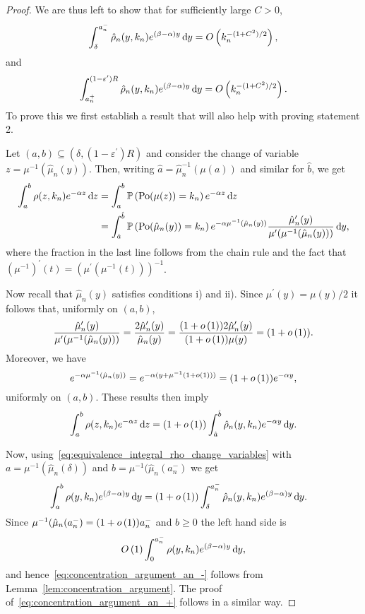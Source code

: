 \begin{proof}
We are thus left to show that for sufficiently large $C > 0$,
\begin{equation}\label{eq:concentration_argument_an_-}
	 \int_\delta^{a_n^-} \hat{\rho}_n(y,k_n) e^{(\beta-\alpha) y} \operatorname{\mathrm{d}\hspace{-2pt}} y = O\left(k_n^{-(1+C^2)/2}\right),
\end{equation}
and
\begin{equation}\label{eq:concentration_argument_an_+}
	\int_{a_n^+}^{(1-\varepsilon^\prime)R} \hat{\rho}_n(y,k_n) e^{(\beta-\alpha) y} \operatorname{\mathrm{d}\hspace{-2pt}} y = O\left(k_n^{-(1+C^2)/2}\right).
\end{equation}
To prove this we first establish a result that will also help with proving statement 2. 

Let $(a, b) \subseteq (\delta,(1-\varepsilon^\prime)R)$ and consider the change of variable $z = \mu^{-1}(\hat{\mu}_n(y))$. Then, writing $\hat{a} = \hat{\mu}_n^{-1}(\mu(a))$ and similar for $\hat{b}$, we get
\begin{align*}
	\int_{a}^{b} \rho(z,k_n) e^{-\alpha z} \operatorname{\mathrm{d}\hspace{-2pt}} z 
	&= \int_{a}^{b} \mathbb{P}\left({\mathrm{Po}}(\mu(z)) = k_n\right) e^{-\alpha z} \operatorname{\mathrm{d}\hspace{-2pt}} z\\
	&= \int_{\hat{a}}^{\hat{b}} \mathbb{P}\left({\mathrm{Po}}(\hat{\mu}_n(y)) = k_n\right) e^{-\alpha \mu^{-1}(\hat{\mu}_n(y))} 
		\frac{\hat{\mu}_n^\prime(y)}{\mu^\prime(\mu^{-1}(\hat{\mu}_n(y)))} \operatorname{\mathrm{d}\hspace{-2pt}} y,
\end{align*}
where the fraction in the last line follows from the chain rule and the fact that $(\mu^{-1})^\prime(t) = (\mu^\prime(\mu^{-1}(t)))^{-1}$.

Now recall that $\hat{\mu}_n(y)$ satisfies conditions i) and ii). Since $\mu^\prime(y) = \mu(y)/2$ it follows that, uniformly on $(a,b)$,
\[
	\frac{\hat{\mu}_n^\prime(y)}{\mu^\prime(\mu^{-1}(\hat{\mu}_n(y)))}
	= \frac{2\hat{\mu}_n^\prime(y)}{\hat{\mu}_n(y)}
	= \frac{(1 + o\left(1\right))2\hat{\mu}_n^\prime(y)}{(1 + o\left(1\right))\mu(y)}
	= (1+o\left(1\right)).
\]
Moreover, we have
\[
	e^{-\alpha \mu^{-1}(\hat{\mu}_n(y))} = e^{-\alpha (y + \mu^{-1}(1+o\left(1\right)))} = (1+o\left(1\right))e^{-\alpha y},
\]
uniformly on $(a,b)$. These results then imply
\begin{equation}\label{eq:equivalence_integral_rho_change_variables}
	\int_{a}^{b} \rho(z,k_n) e^{-\alpha z} \operatorname{\mathrm{d}\hspace{-2pt}} z 
	= (1+o\left(1\right)) \int_{\hat{a}}^{\hat{b}} \hat{\rho}_n(y,k_n) e^{-\alpha y} \operatorname{\mathrm{d}\hspace{-2pt}} y.
\end{equation}

Now, using~\eqref{eq:equivalence_integral_rho_change_variables} with $a = \mu^{-1}(\hat{\mu}_n(\delta))$ and $b = \mu^{-1}(\hat{\mu}_n(a_n^-)$ we get
\begin{align*}
	\int_a^b \rho(y,k_n) e^{(\beta-\alpha) y} \operatorname{\mathrm{d}\hspace{-2pt}} y
	&= (1+o\left(1\right)) \int_{\delta}^{a_n^-} \hat{\rho}_n(y,k_n) e^{(\beta - \alpha)y} \operatorname{\mathrm{d}\hspace{-2pt}} y.
\end{align*}
Since $\mu^{-1}(\hat{\mu}_n(a_n^-) = (1+o\left(1\right))a_n^-$ and $b \ge 0$ the left hand side is
\[
	O\left(1\right) \int_0^{a_n^-} \rho(y,k_n) e^{(\beta-\alpha) y} \operatorname{\mathrm{d}\hspace{-2pt}} y,
\]
and hence~\eqref{eq:concentration_argument_an_-} follows from Lemma~\ref{lem:concentration_argument}. The proof of~\eqref{eq:concentration_argument_an_+} follows in a similar way.


\end{proof}
